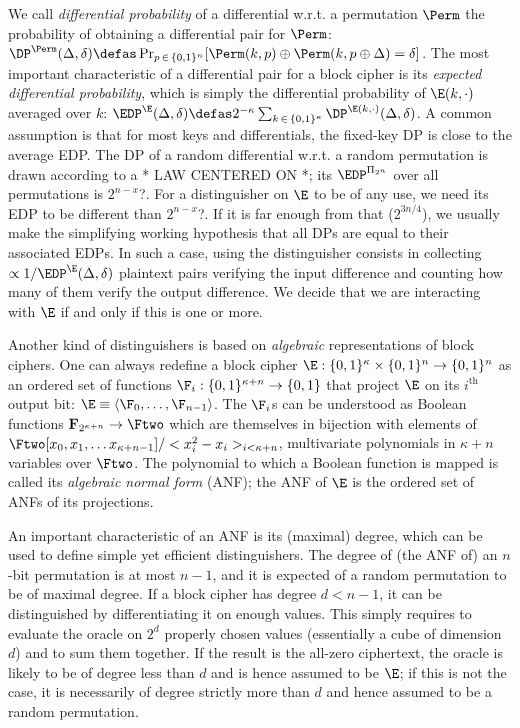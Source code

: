 We call \emph{differential probability} of a differential w.r.t. a permutation $\Perm$ the probability of obtaining a differential pair
for $\Perm$:
$\DP^{\Perm}(\Delta,\delta) \defas \Pr_{p\,\in\,\{0,1\}^n}[\Perm(k,p) \oplus \Perm(k,p \oplus \Delta) = \delta]$.
The most important characteristic of a differential pair for a block cipher is its \emph{expected differential probability}, which
is simply the differential probability of $\E(k,\cdot)$ averaged over $k$:
$\EDP^{\E}(\Delta,\delta) \defas 2^{-\kappa}\sum_{k\,\in\,\{0,1\}^\kappa} \DP^{\E(k,\cdot)}(\Delta,\delta)$.
A common assumption is that for most keys and differentials, the fixed-key DP is close to the average EDP.
The DP of a random differential w.r.t. a random permutation is
drawn according to a {\color{red}* LAW CENTERED ON *}; its $\EDP^{\Pi_{2^n}}$ over all permutations is {\color{red}$2^{n-x}$?}.
For a distinguisher on $\E$ to be of any use, we need its EDP to be different than {\color{red}$2^{n-x}$?}. If it is far enough
from that (\eg $2^{3n/4}$), we usually make the simplifying working hypothesis that all DPs are equal to their associated EDPs.
In such a case, using the distinguisher consists in collecting $\propto 1/\EDP^{\E}(\Delta,\delta)$ plaintext pairs verifying
the input difference and counting how many of them verify the output difference. We decide that we are interacting with $\E$ if and only if this is one or more.

\bigskip

Another kind of distinguishers is based on \emph{algebraic} representations of block ciphers. One can always redefine a block cipher
$\E : \{0,1\}^\kappa \times \{0,1\}^n \rightarrow \{0,1\}^n$ as an ordered set of functions $\F_i : \{0,1\}^{\kappa+n} \rightarrow \{0,1\}$ that project
$\E$ on its $i^\text{th}$ output bit: $\E \equiv \langle \F_0, \ldots, \F_{n-1} \rangle$. The $\F_i$s can be understood as Boolean functions
$\mathbf{F}_{2^{\kappa + n}} \rightarrow \Ftwo$ which are themselves in bijection with elements of $\Ftwo[x_0,x_1,\ldots x_{\kappa + n-1}]/<x_i^2-x_i>_{i<\kappa + n}$,
\ie multivariate polynomials in $\kappa + n$ variables over $\Ftwo$. The polynomial to which a Boolean function is mapped is called its \emph{algebraic normal form} (ANF);
the ANF of $\E$ is the ordered set of ANFs of its projections.

An important characteristic of an ANF is its (maximal) degree, which can be used to define simple yet efficient distinguishers. The degree
of (the ANF of) an $n$-bit permutation is at most $n - 1$, and it is expected of a random permutation to be of maximal degree. If a block cipher
has degree $d < n - 1$, it can be distinguished by differentiating it on enough values. This simply requires to evaluate the oracle on $2^d$ properly chosen
values (essentially a cube of dimension $d$) and to sum them together. If the result is the all-zero ciphertext, the oracle is likely to be of degree less than
$d$ and is hence assumed to be $\E$; if this is not the case, it is necessarily of degree strictly more than $d$ and hence assumed to be a random permutation.

